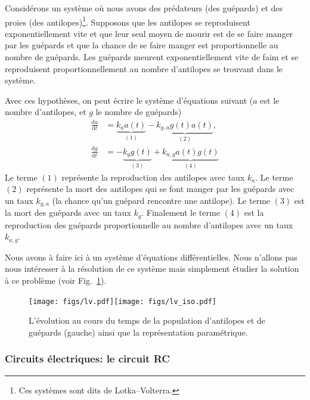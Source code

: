 \documentclass[a4paper,12pt]{book}
\newcommand{\dd}{\mathrm{d}}
\begin{document}
Considérons un système où nous avons des prédateurs (des guépards) et des proies (des antilopes)\footnote{Ces systèmes sont dits de Lotka--Volterra.}. 
Supposons que les antilopes se reproduisent exponentiellement vite et que leur seul moyen de mourir 
est de se faire manger par les guépards et que la chance de se faire manger est proportionnelle au nombre de guépards. 
Les guépards meurent exponentiellement vite de faim et se reproduisent 
proportionnellement au nombre d'antilopes se trouvant dans le système. 

Avec ces hypothèses, on peut écrire le système d'équations suivant ($a$ est le nombre d'antilopes, et $g$ le nombre de guépards)
\begin{align*}
\frac{\dd a}{\dd t}&= \underbrace{k_a a(t)}_{(1)}-\underbrace{k_{g,a}g(t) a(t)}_{(2)},\\
\frac{\dd g}{\dd t}&= -\underbrace{k_g g(t)}_{(3)} +\underbrace{k_{a,g} a(t)g(t)}_{(4)}
\end{align*}
Le terme $(1)$ représente la reproduction des antilopes avec taux $k_a$. Le terme $(2)$ représente la mort des antilopes qui se font manger par les guépards
avec un taux $k_{g,a}$ (la chance qu'un guépard rencontre une antilope).
Le terme $(3)$ est la mort des guépards avec un taux $k_g$. Finalement le terme $(4)$ est la reproduction des guépards proportionnelle au nombre d'antilopes
avec un taux $k_{a,g}$.

Nous avons à faire ici à un système d'équations différentielles. Nous n'allons pas nous intéresser à la résolution 
de ce système mais simplement étudier la solution à ce problème (voir Fig.~\ref{fig_lk}). 
\begin{figure}
\texttt{[image: figs/lv.pdf]}\texttt{[image: figs/lv\_iso.pdf]}
\caption{L'évolution au cours du temps de la population d'antilopes et de guépards (gauche) ainsi que la représentation paramétrique.}\label{fig_lk}
\end{figure}

\subsubsection{Circuits électriques: le circuit RC}
\end{document}
